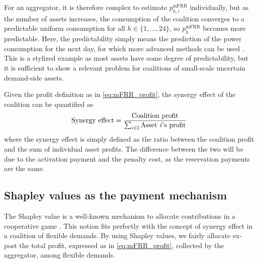 \documentclass[conference]{IEEEtran}
\begin{document}
For an aggregator, it is therefore complex to estimate $p^{\text{mFRR}}_{h, i}$ individually, but as the number of assets increases, the consumption of the coalition converges to a predictable uniform consumption for all $h \in \{1, \hdots, 24 \}$, so $p^{\text{mFRR}}_{h}$ becomes more predictable. Here, the predictability simply means the prediction of the power consumption for the next day, for which more advanced methods can be used \cite{ziras2021baselines}.
This is a stylized example as most assets have some degree of predictability, but it is sufficient to show a relevant problem for coalitions of small-scale uncertain demand-side assets.

Given the profit definition as in \eqref{eq:mFRR_profit}, the synergy effect of the coalition can be quantified as
%
\begin{align}\label{eq:synergy_effect}
    \text{Synergy effect} = \frac{ \text{Coalition profit} }{ \sum_{i \in \mathbb{I}} \text{Asset \textit{i}'s profit} }
\end{align}
where the synergy effect is simply defined as the ratio between the coalition profit and the sum of individual asset profits. The difference between the two will be due to the activation payment and the penalty cost, as the reservation payments are the same.

\subsection{Shapley values as the payment mechanism}
%
The Shapley value is a well-known mechanism to allocate contributions in a cooperative game \cite{shapley1997value}. This notion fits perfectly with the concept of synergy effect in a coalition of flexible demands. By using Shapley values, we fairly allocate ex-post the total profit, expressed as in \eqref{eq:mFRR_profit}, collected by the aggregator, among flexible demands.


\end{document}
